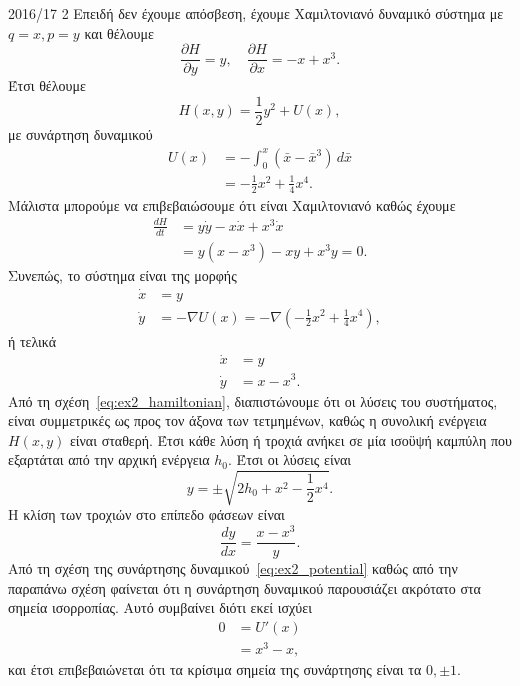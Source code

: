 \begin{solution}{2016/17 2}
    Επειδή δεν έχουμε απόσβεση, έχουμε Χαμιλτονιανό δυναμικό σύστημα με
    \( q = x, p = y \) και θέλουμε
    \begin{equation*}
        \frac{\partial H}{\partial y} = y, \quad
        \frac{\partial H}{\partial x} = -x + x^3.
    \end{equation*}
    Έτσι θέλουμε
    \begin{equation}\label{eq:ex2_hamiltonian}
        H(x, y) = \frac{1}{2}y^2 + U(x),
    \end{equation}
    με συνάρτηση δυναμικού
    \begin{align}\label{eq:ex2_potential}
        U(x) &= - \int_0^x \left(\bar{x} - \bar{x}^3 \right) \, d\bar{x}
        \nonumber \\
        &= -\frac{1}{2}x^2 + \frac{1}{4}x^4.
    \end{align}
    Μάλιστα μπορούμε να επιβεβαιώσουμε ότι είναι Χαμιλτονιανό καθώς έχουμε
    \begin{align*}
        \frac{dH}{dt}
        &= y\dot{y} - x\dot{x} + x^3\dot{x} \\
        &= y(x - x^3) - xy + x^3y = 0.
    \end{align*}
    Συνεπώς, το σύστημα είναι της μορφής
    \begin{align*}
        \dot{x} &= y \\
        \dot{y} &= -\nabla U(x) = -\nabla\left( -\frac{1}{2}x^2 +
        \frac{1}{4}x^4 \right),
    \end{align*}
    ή τελικά
    \begin{align*}
        \dot{x} &= y \\
        \dot{y} &= x - x^3.
    \end{align*}
    Από τη σχέση~\eqref{eq:ex2_hamiltonian}, διαπιστώνουμε ότι οι λύσεις του
    συστήματος, είναι συμμετρικές ως προς τον άξονα των τετμημένων, καθώς
    η συνολική ενέργεια \( H(x, y) \) είναι σταθερή. Έτσι κάθε λύση ή τροχιά
    ανήκει σε μία ισοϋψή καμπύλη που εξαρτάται από την αρχική ενέργεια
    \( h_0 \). Έτσι οι λύσεις είναι
    \begin{equation*}
        y = \pm \sqrt{2h_0 + x^2 - \frac{1}{2}x^4}.
    \end{equation*}
    Η κλίση των τροχιών στο επίπεδο φάσεων είναι
    \begin{equation*}
        \frac{dy}{dx} = \frac{x - x^3}{y}.
    \end{equation*}
    Από τη σχέση της συνάρτησης δυναμικού~\eqref{eq:ex2_potential} καθώς από
    την παραπάνω σχέση φαίνεται ότι η συνάρτηση δυναμικού παρουσιάζει ακρότατο
    στα σημεία ισορροπίας. Αυτό συμβαίνει διότι εκεί ισχύει
    \begin{align*}
        0 &= U'(x) \\
        &= x^3 - x,
    \end{align*}
    και έτσι επιβεβαιώνεται ότι τα κρίσιμα σημεία της συνάρτησης είναι τα
    \( 0, \pm 1 \).


\end{solution}
